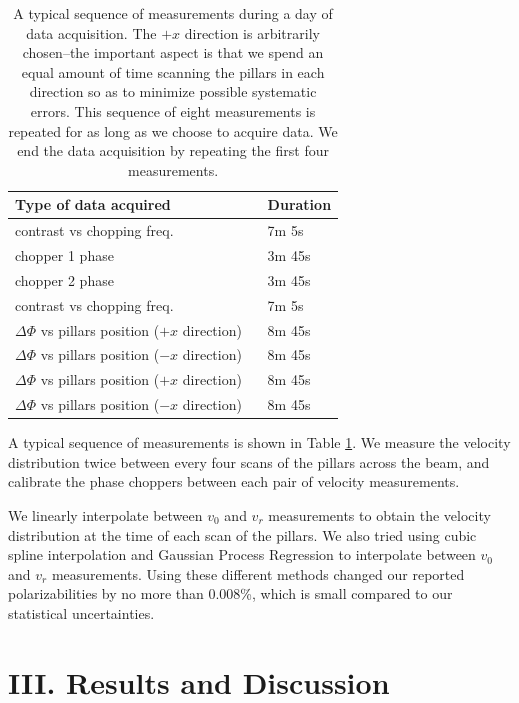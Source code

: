 \documentclass[twocolumn,prl,showpacs,superscriptaddress]{revtex4-1}   %
\newcommand{\sspace}{$\enspace$}
\begin{document}
\begingroup
\begin{table}
\caption{\label{schedule}A typical sequence of measurements during a day of data acquisition. The $+x$ direction is arbitrarily chosen--the important aspect is that we spend an equal amount of time scanning the pillars in each direction so as to minimize possible systematic errors. This sequence of eight measurements is repeated for as long as we choose to acquire data. We end the data acquisition by repeating the first four measurements.}
\begin{center}
\begin{tabular}{l l}
\hline
\hline
Type of data acquired & Duration \\
\hline
contrast vs chopping freq. & 7m 5s \\
chopper 1 phase & 3m 45s \\
chopper 2 phase & 3m 45s\\
contrast vs chopping freq. & 7m 5s \\
$\Delta\Phi$ vs pillars position ($+x$ direction) \sspace & 8m 45s \\
$\Delta\Phi$ vs pillars position ($-x$ direction) & 8m 45s \\
$\Delta\Phi$ vs pillars position ($+x$ direction) & 8m 45s \\
$\Delta\Phi$ vs pillars position ($-x$ direction) & 8m 45s \\
\hline
\hline
\end{tabular}
\end{center}
\end{table}
\endgroup

A typical sequence of measurements is shown in Table \ref{schedule}.
We measure the velocity distribution twice between every four scans of the pillars across the beam, and calibrate the phase choppers between each pair of velocity measurements.

We linearly interpolate between $v_0$ and $v_r$ measurements to obtain the velocity distribution at the time of each scan of the pillars.
We also tried using cubic spline interpolation and Gaussian Process Regression to interpolate between $v_0$ and $v_r$ measurements. Using these different methods changed our reported polarizabilities by no more than 0.008\%, which is small compared to our statistical uncertainties.

\section{III. Results and Discussion}
\end{document}
